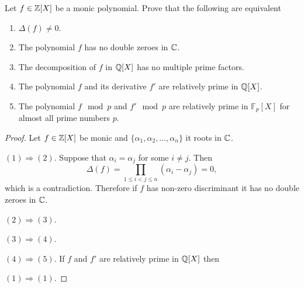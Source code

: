     \begin{ex}{14.17}
        Let $f\in\mathbb{Z}[X]$ be a monic polynomial. Prove that the following are equivalent
        \begin{enumerate}
            \item $\Delta(f)\neq 0$.
            \item The polynomial $f$ has no double zeroes in $\mathbb{C}$.
            \item The decomposition of $f$ in $\mathbb{Q}[X]$ has no multiple prime factors.
            \item The polynomial $f$ and its derivative $f'$ are relatively prime in $\mathbb{Q}[X]$.
            \item The polynomial $f\mod p $ and $f' \mod p$ are relatively prime in $\mathbb{F}_p[X]$ for almost all prime numbers $p$.
        \end{enumerate}
    \end{ex}
    \begin{proof}
        Let  $f\in\mathbb{Z}[X]$ be monic and $\{\alpha_1,\alpha_2,\dots,\alpha_n\}$ it roots in $\mathbb{C}$.

        $(1)\Rightarrow  (2)$. Suppose that $\alpha_i=\alpha_j$ for some $i\neq j$. Then 
        $$\Delta(f)=\prod_{1\leq i<j\leq n}(\alpha_i-\alpha_j)= 0,$$ 
        which is a contradiction.
        Therefore if $f$ has non-zero discriminant it has no double zeroes in $\mathbb{C}$. 

        $(2)\Rightarrow (3)$.
        
        $(3)\Rightarrow (4)$.

        $(4)\Rightarrow (5)$. If $f$ and $f'$ are relatively prime in $\mathbb{Q}[X]$ then 

        $(1)\Rightarrow (1)$. 
    \end{proof}

